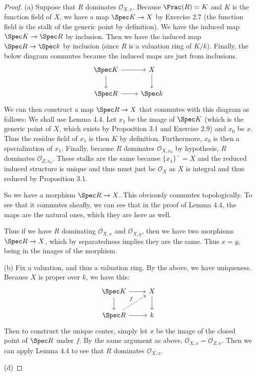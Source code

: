 \begin{proof}
	(a) Suppose that $R $ dominates $\mathscr{O}_{X,x} $.
	Because $\Frac(R) = K $ and $K $ is the function field of $X $, we have a map $\Spec K \to X $ by Exercise 2.7 (the function field is the stalk of the generic point by definition).
	We have the induced map $\Spec K\to \Spec R $ by inclusion.
	Then we have the induced map $\Spec R \to \Spec k $ by inclusion (since $R $ is a valuation ring of $K / k $).
	Finally, the below diagram commutes because the induced maps are just from inclusions.
	\[
	\begin{tikzcd}
	\Spec K & X\\
	\Spec R & \Spec k
	\arrow[from=1-1,to=1-2]
	\arrow[from=1-1,to=2-1]
	\arrow[from=2-1,to=2-2]
	\arrow[from=1-2,to=2-2]
	\end{tikzcd}
	\]
	We can then construct a map $\Spec R\to X $ that commutes with this diagram as follows:
	We shall use Lemma 4.4.
	Let $x_{1}$ be the image of $\Spec K $ (which is the generic point of $X $, which exists by Proposition 3.1 and Exercise 2.9) and $x_{0} $ be $x $.
	Thus the residue field of $x_{1} $ is then $K $ by definition.
	Furthermore, $x_{0} $ is then a specialization of $x_{1} $.
	Finally, because $R $ dominates $\mathcal{O}_{X,x_{0}} $ by hypothesis, $R $ dominates $\mathcal{O}_{Z,x_{0}} $.
	These stalks are the same because $\{x_{1}\}^- = X  $ and the reduced induced structure is unique and thus must just be $\mathcal{O}_X $ as $X $ is integral and thus reduced by Proposition 3.1.

	So we have a morphism $\Spec R \to X $.
	This obviously commutes topologically.
	To see that it commutes sheafly, we can see that in the proof of Lemma 4.4, the maps are the natural ones, which they are here as well.

	Thus if we have $R $ dominating $\mathcal{O}_{X,x} $ and $\mathcal{O}_{X,y} $, then we have two morphisms $\Spec R\to X $, which by separatedness implies they are the same.
	Thus $x=y $, being in the images of the morphism.

	(b) Fix a valuation, and thus a valuation ring.
	By the above, we have uniqueness.
	Because $X $ is proper over $k $, we have this:
	\[
	\begin{tikzcd}
	\Spec K & X\\
	\Spec R & k
	\arrow[from=1-1,to=1-2]
	\arrow[from=1-1,to=2-1]
	\arrow[from=2-1,to=2-2]
	\arrow[from=1-2,to=2-2]
	\arrow["f",dashed,from=2-1,to=1-2]
	\end{tikzcd}
	\]
	Then to construct the unique center, simply let $x $ be the image of the closed point of $\Spec R $ under $f $.
	By the same argument as above, $\mathcal{O}_{X,x} = \mathcal{O}_{Z,x} $.
	Then we can apply Lemma 4.4 to see that $R $ dominates $\mathcal{O}_{X,x}$.

	(d)
\end{proof}

